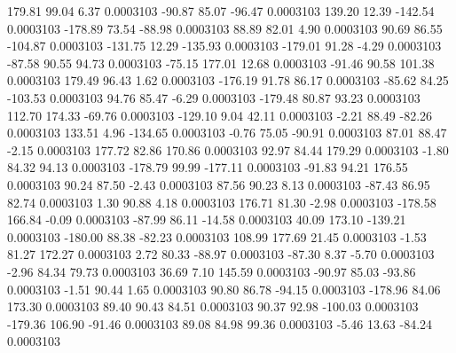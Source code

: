       179.81       99.04        6.37     0.0003103
      -90.87       85.07      -96.47     0.0003103
      139.20       12.39     -142.54     0.0003103
     -178.89       73.54      -88.98     0.0003103
       88.89       82.01        4.90     0.0003103
       90.69       86.55     -104.87     0.0003103
     -131.75       12.29     -135.93     0.0003103
     -179.01       91.28       -4.29     0.0003103
      -87.58       90.55       94.73     0.0003103
      -75.15      177.01       12.68     0.0003103
      -91.46       90.58      101.38     0.0003103
      179.49       96.43        1.62     0.0003103
     -176.19       91.78       86.17     0.0003103
      -85.62       84.25     -103.53     0.0003103
       94.76       85.47       -6.29     0.0003103
     -179.48       80.87       93.23     0.0003103
      112.70      174.33      -69.76     0.0003103
     -129.10        9.04       42.11     0.0003103
       -2.21       88.49      -82.26     0.0003103
      133.51        4.96     -134.65     0.0003103
       -0.76       75.05      -90.91     0.0003103
       87.01       88.47       -2.15     0.0003103
      177.72       82.86      170.86     0.0003103
       92.97       84.44      179.29     0.0003103
       -1.80       84.32       94.13     0.0003103
     -178.79       99.99     -177.11     0.0003103
      -91.83       94.21      176.55     0.0003103
       90.24       87.50       -2.43     0.0003103
       87.56       90.23        8.13     0.0003103
      -87.43       86.95       82.74     0.0003103
        1.30       90.88        4.18     0.0003103
      176.71       81.30       -2.98     0.0003103
     -178.58      166.84       -0.09     0.0003103
      -87.99       86.11      -14.58     0.0003103
       40.09      173.10     -139.21     0.0003103
     -180.00       88.38      -82.23     0.0003103
      108.99      177.69       21.45     0.0003103
       -1.53       81.27      172.27     0.0003103
        2.72       80.33      -88.97     0.0003103
      -87.30        8.37       -5.70     0.0003103
       -2.96       84.34       79.73     0.0003103
       36.69        7.10      145.59     0.0003103
      -90.97       85.03      -93.86     0.0003103
       -1.51       90.44        1.65     0.0003103
       90.80       86.78      -94.15     0.0003103
     -178.96       84.06      173.30     0.0003103
       89.40       90.43       84.51     0.0003103
       90.37       92.98     -100.03     0.0003103
     -179.36      106.90      -91.46     0.0003103
       89.08       84.98       99.36     0.0003103
       -5.46       13.63      -84.24     0.0003103
